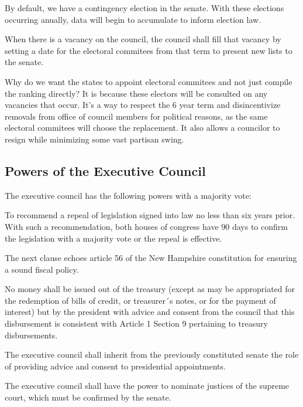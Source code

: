 \documentclass{article}
\begin{document}
By default, we have a contingency election in the senate. With these elections occurring anually, data will begin to accumulate to inform election law.

\begin{quoting}
When there is a vacancy on the council, the council shall fill that vacancy by setting a date for the electoral commitees from that term to present new lists to the senate.
\end{quoting}

Why do we want the states to appoint electoral commitees and not just compile the ranking directly? It is because these electors will be consulted on any vacancies that occur. It’s a way to respect the 6 year term and disincentivize removals from office of council members for political reasons, as the same electoral commitees will choose the replacement. It also allows a councilor to resign while minimizing some vast partisan swing.

\subsection{Powers of the Executive Council}

\begin{quoting}
The executive council has the following powers with a majority vote:

To recommend a repeal of legislation signed into law no less than six years prior. With such a recommendation, both houses of congress have 90 days to confirm the legislation with a majority vote or the repeal is effective.
\end{quoting}

The next clause echoes article 56 of the New Hampshire constitution\cite{New Hampshire Constitution} for ensuring a sound fiscal policy.

\begin{quoting}
No money shall be issued out of the treasury (except as may be appropriated for the redemption of bills of credit, or treasurer´s notes, or for the payment of interest) but by the president with advice and consent from the council that this disbursement is consistent with Article 1 Section 9 pertaining to treasury disbursements.

The executive council shall inherit from the previously constituted senate the role of providing advice and consent to presidential appointments.

The executive council shall have the power to nominate justices of the supreme court, which must be confirmed by the senate.
\end{quoting}
\end{document}
